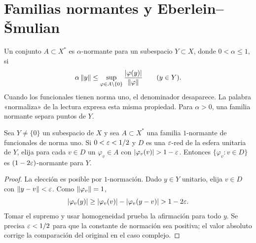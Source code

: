 \section{Familias normantes y Eberlein--Šmulian}\label{lec:v3-17}
\begin{definicion}
Un conjunto $A\subset X^*$ es $\alpha$-normante para un subespacio $Y\subset X$, donde $0<\alpha\le1$, si
\[
 \alpha\left\lVert y\right\rVert\leq\sup_{\varphi\in A\setminus\{0\}}
       \frac{|\varphi(y)|}{\left\lVert\varphi\right\rVert}\qquad(y\in Y).
\]
Cuando los funcionales tienen norma uno, el denominador desaparece. La palabra «normaliza» de la lectura expresa esta misma propiedad. Para $\alpha>0$, una familia normante separa puntos de $Y$.
\end{definicion}
\begin{lema}\label{v3:seleccion-normante}
Sea $Y\ne\{0\}$ un subespacio de $X$ y sea $A\subset X^*$ una familia $1$-normante de funcionales de norma uno. Si $0<\varepsilon<1/2$ y $D$ es una $\varepsilon$-red de la esfera unitaria de $Y$, elija para cada $v\in D$ un $\varphi_v\in A$ con $|\varphi_v(v)|>1-\eps$. Entonces $\{\varphi_v:v\in D\}$ es $(1-2\varepsilon)$-normante para $Y$.
\end{lema}
\begin{proof}
La elección es posible por $1$-normación. Dado $y\in Y$ unitario, elija $v\in D$ con $\left\lVert y-v\right\rVert<\varepsilon$. Como $\left\lVert\varphi_v\right\rVert=1$,
\[
 |\varphi_v(y)|\ge|\varphi_v(v)|-|\varphi_v(y-v)|>1-2\eps.
\]
Tomar el supremo y usar homogeneidad prueba la afirmación para todo $y$. Se precisa $\varepsilon<1/2$ para que la constante de normación sea positiva; el valor absoluto corrige la comparación del original en el caso complejo.
\end{proof}

